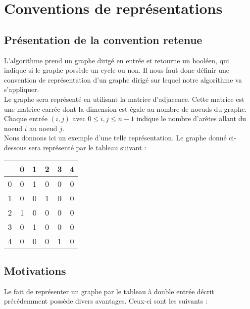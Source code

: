 \section{Conventions de représentations}

\subsection{Présentation de la convention retenue}
L'algorithme prend un graphe dirigé en entrée et retourne un booléen, qui indique si le graphe possède un cycle ou non. Il nous faut donc définir une convention de représentation d'un graphe dirigé sur lequel notre algorithme va s'appliquer. \\

Le graphe sera représenté en utilisant la matrice d'adjacence. Cette matrice est une matrice carrée dont la dimension est égale au nombre de noeuds du graphe. Chaque entrée $(i,j)$ avec $0\leq i,j \leq n-1$ indique le nombre d'arêtes allant du noeud $i$ au noeud $j$.\\

Nous donnons ici un exemple d'une telle représentation. Le graphe donné ci-dessous sera représenté par le tableau suivant :
\begin{multicols}{2}
\begin{center}
\begin{tabular}{c|ccccc}
&0 & 1 & 2 & 3 & 4\\
\hline
0&0&1&0&0&0\\
1&0&0&1&0&0\\
2&1&0&0&0&0\\
3&0&1&0&0&0\\
4&0&0&0&1&0\\
\end{tabular}
\end{center}
\end{multicols}

\subsection{Motivations}
Le fait de représenter un graphe par le tableau à double entrée décrit précédemment possède divers avantages. Ceux-ci sont les suivants : \\

